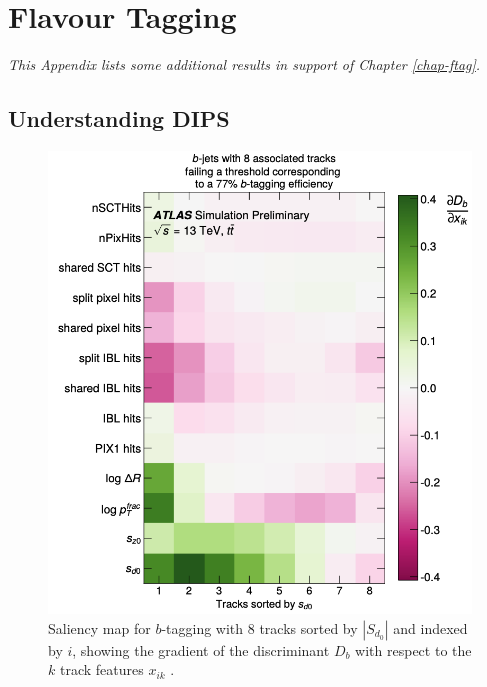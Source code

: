 \chapter{Flavour Tagging}
\ChapFrame
\textit{This Appendix lists some additional results in support of Chapter \ref{chap-ftag}.}

\section{Understanding DIPS}\label{app-DIPS-perf}
\begin{figure}[h!]
  \center
  \begin{minipage}[c]{0.7\textwidth}
    \includegraphics[width=\textwidth]{Images/FTAG/dipsSaliency.png}
  \end{minipage}
  \begin{minipage}[c]{0.25\textwidth}
    \caption{Saliency map for $b$-tagging with 8 tracks sorted by $|S_{d_0}|$ and indexed by $i$, showing the gradient of the discriminant $D_b$ with respect to the $k$ track features $x_{ik}$ \cite{ATL-PHYS-PUB-2020-014}.} 
  \label{fig:dipsSaliency}
  \end{minipage}
\end{figure}

